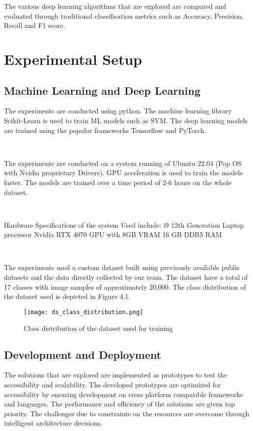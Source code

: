 \label{chap.4}
The various deep learning algorithms that are explored are compared and evaluated through traditional classification metrics such as Accuracy, Precision, Recall and F1 score.
\section{Experimental Setup}

\subsection{Machine Learning and Deep Learning}
 The experiments are conducted using python. The machine learning library Scikit-Learn is used to train ML models such as SVM. The deep learning models are trained using the popular frameworks Tensorflow and PyTorch. 

 \

 The experiments are conducted on a system running of Ubuntu 22.04 (Pop OS with Nvidia proprietary Drivers). GPU acceleration is used to train the models faster. The models are trained over a time period of 2-6 hours on the whole dataset.


 \

 Hardware Specifications of the system Used include:
 i9 12th Generation Laptop processor
 Nvidia RTX 4070 GPU with 8GB VRAM 
 16 GB DDR5 RAM

\

The experiments used a custom dataset built using previously available public datasets and the data directly collected by our team. The dataset have a total of 17 classes with image samples of approximately 20,000. The class distribution of the dataset used is depicted in Figure 4.1.


\begin{figure}[h!]
    \centering
    \texttt{[image: ds\_class\_distribution.png]}
    \caption{Class distribution of the dataset used for training}
    \label{fig:ds_class_distribution}
\end{figure}

\subsection{Development and Deployment}

The solutions that are explored are implemented as prototypes to test the accessibility and scalability. The developed prototypes are optimized for accessibility by ensuring development on cross platform compatible frameworks and languages. The performance and efficiency of the solutions are given top priority. The challenges due to constraints on the resources are overcome through intelligent architecture decisions.

